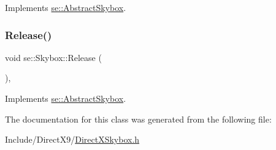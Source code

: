 Implements \mbox{\hyperlink{classse_1_1_abstract_skybox_a652add712c92f3d7ebe7f82dc353fa1c}{se\+::\+Abstract\+Skybox}}.

\mbox{\label{classse_1_1_skybox_ad9a6b80274236240aba6eaafaf7d2e9c}} 
\subsubsection{\texorpdfstring{Release()}{Release()}}
{\footnotesize\ttfamily void se\+::\+Skybox\+::\+Release (\begin{DoxyParamCaption}{ }\end{DoxyParamCaption})\hspace{0.3cm}{\ttfamily [override]}, {\ttfamily [virtual]}}



Implements \mbox{\hyperlink{classse_1_1_abstract_skybox_a5aa158b7db1140ffc5c696347f32e2ef}{se\+::\+Abstract\+Skybox}}.



The documentation for this class was generated from the following file\+:\begin{DoxyCompactItemize}
\item 
Include/\+Direct\+X9/\mbox{\hyperlink{_direct_x_skybox_8h}{Direct\+X\+Skybox.\+h}}\end{DoxyCompactItemize}
